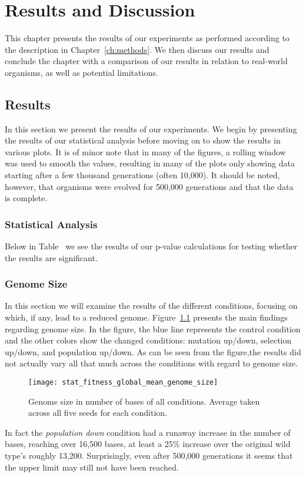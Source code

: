 \chapter{Results and Discussion}\label{ch:results_discussion}
This chapter presents the results of our experiments as performed according to the description in Chapter~\ref{ch:methods}. We then discuss our results and conclude the chapter with a comparison of our results in relation to real-world organisms, as well as potential limitations.

\section{Results}\label{results}
In this section we present the results of our experiments. We begin by presenting the results of our statistical analysis before moving on to show the results in various plots. It is of minor note that in many of the figures, a rolling window was used to smooth the values, resulting in many of the plots only showing data starting after a few thousand generations (often 10,000). It should be noted, however, that organisms were evolved for 500,000 generations and that the data is complete. 

\subsection{Statistical Analysis}
Below in Table~ we see the results of our p-value calculations for testing whether the results are significant.   

\subsection{Genome Size}\label{sec:genome_size}
In this section we will examine the results of the different conditions, focusing on which, if any, lead to a reduced genome. Figure~\ref{fig:genome_size}
presents the main findings regarding genome size. In the figure, the blue line represents the control condition and the other colors show the changed conditions: mutation up/down, selection up/down, and population up/down. As can be seen from the figure,the results did not actually vary all that much across the conditions with regard to genome size.  
\begin{figure}[H]
	\texttt{[image: stat\_fitness\_global\_mean\_genome\_size]}
	\centering
	\caption[Genome size]{Genome size in number of bases of all conditions. Average taken across all five seeds for each condition.}
	\label{fig:genome_size}
\end{figure}
In fact the \textit{population down} condition had a runaway increase in the number of bases, reaching over 16,500 bases, at least a 25\% increase over the original wild type's roughly 13,200. Surprisingly, even after 500,000 generations it seems that the upper limit may still not have been reached. 

